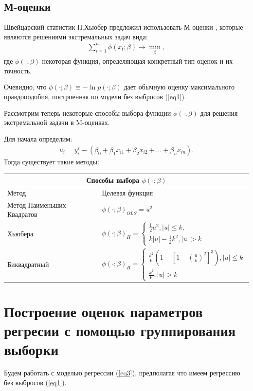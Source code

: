 \documentclass[a4paper,14pt]{extarticle}
\begin{document}
\subsection{М-оценки}
Швейцарский статистик П.Хьюбер предложил использовать М-оценки \cite{Kharin}, которые являются решениями экстремальных задач вида:
\begin{eqnarray}
    \sum_{i=1}^{n}\phi(x_t;\beta)\rightarrow \min_{\beta},
\end{eqnarray}
где $\phi(\cdot;\beta)$-некоторая функция, определяющая конкретный тип оценок и их точность.

Очевидно, что $\phi(\cdot;\beta)\equiv - \ln{p(\cdot;\beta)}$ дает обычную оценку максимального правдоподобия, построенная по модели без выбросов (\ref{eq1}).

Рассмотрим теперь некоторые способы выбора функции $\phi(\cdot;\beta)$ для решения экстремальной задачи в M-оценках.

Для начала определим:
\begin{eqnarray}
    u_i=y_i^{\widetilde{\varepsilon}}-(\beta_0+\beta_1 x_{i1}+\beta_2 x_{i2}+\dots+\beta_n x_{in}).
\end{eqnarray}
Тогда существует такие методы\cite{RobustRegression}:\hfill\break
\begin{center}
\begin{tabular}{ |p{3cm}|p{10cm} | }
    \hline
    \multicolumn{2}{|c|}{Способы выбора $\phi(\cdot;\beta)$} \\
    \hline
    Метод& Целевая функция\\
    \hline
    Метод Наименьших Квадратов&$\phi(\cdot;\beta)_{OLS}=u^2$\\
    \hline
    Хьюбера&$\phi(\cdot;\beta)_{H}=
        \begin{cases}
            \frac{1}{2}u^2, |u|\leq k,\\
            k|u|-\frac{1}{2}k^2, |u|>k
        \end{cases}$\\
    \hline
    Биквадратный& $\phi(\cdot;\beta)_{B}=
    \begin{cases}
        \frac{k^2}{6}(1-[1-(\frac{u}{k})^2]^3), |u|\leq k\\
        \frac{k^2}{6}, |u|>k
    \end{cases}$\\
    \hline
\end{tabular}
\end{center}
\newpage

\section{Построение оценок параметров регресии с помощью группирования выборки}\label{sec4}
Будем работать с моделью регрессии (\ref{eq3}), предполагая что имеем регрессию без выбросов (\ref{eq1}). 
\end{document}
